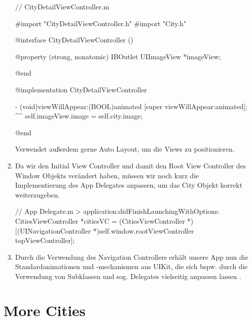 \documentclass[parskip=half, final]{scrreprt}
\begin{document}
\begin{lecture}
\begin{enumerate}

\begin{objclst}
// CityDetailViewController.m

#import "CityDetailViewController.h"
#import "City.h"

@interface CityDetailViewController ()

@property (strong, nonatomic) IBOutlet UIImageView *imageView;

@end

@implementation CityDetailViewController

- (void)viewWillAppear:(BOOL)animated {
    [super viewWillAppear:animated];
    ^^
    self.imageView.image = self.city.image;
}

@end
\end{objclst}

Verwendet außerdem gerne Auto Layout, um die Views zu positionieren.

\item Da wir den Initial View Controller und damit den Root View Controller des Window Objekts verändert haben, müssen wir noch kurz die Implementierung des App Delegates anpassen, um das City Objekt korrekt weiterzugeben.

\begin{objclst}
// App Delegate.m > application:didFinishLaunchingWithOptions:
CitiesViewController *citiesVC = (CitiesViewController *)[(UINavigationController *)self.window.rootViewController topViewController];
\end{objclst}


\item Durch die Verwendung des Navigation Controllers erhält unsere App nun die Standardanimationen und -mechanismen aus UIKit, die sich bspw. durch die Verwendung von Subklassen und sog. Delegates vielseitig anpassen lassen .


\end{enumerate}


\section{More Cities}


\end{lecture}
\end{document}
